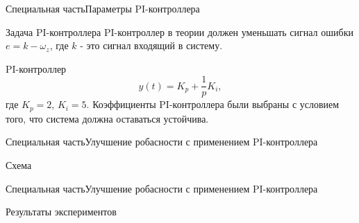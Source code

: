 
\begin{frame}{Специальная часть}{Параметры PI-контроллера}
    \begin{block}{Задача PI-контроллера}
        PI-контроллер в теории должен уменьшать сигнал ошибки $e =k - \omega_z$, где $k$ - это сигнал входящий в систему.
    \end{block}
    \begin{block}{PI-контроллер}
        $$y(t) = K_p + \frac{1}{p}K_i,$$
        где $K_p = 2$, $K_i = 5$.
        Коэффициенты PI-контроллера были выбраны с условием того, что система должна оставаться устойчива.     
    \end{block}
\end{frame}

\begin{frame}{Специальная часть}{Улучшение робасности с применением PI-контроллера}
    \begin{block}{Схема}
    \end{block}
\end{frame}

\begin{frame}{Специальная часть}{Улучшение робасности с применением PI-контроллера}
    \begin{block}{Результаты экспериментов}
    \end{block}
\end{frame}


